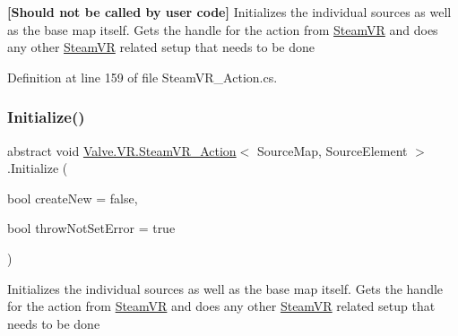{\bfseries{\mbox{[}Should not be called by user code\mbox{]}}} Initializes the individual sources as well as the base map itself. Gets the handle for the action from \mbox{\hyperlink{class_valve_1_1_v_r_1_1_steam_v_r}{Steam\+VR}} and does any other \mbox{\hyperlink{class_valve_1_1_v_r_1_1_steam_v_r}{Steam\+VR}} related setup that needs to be done 



Definition at line 159 of file Steam\+V\+R\+\_\+\+Action.\+cs.

\mbox{\label{class_valve_1_1_v_r_1_1_steam_v_r___action_a29bea2023c1139d9bd612b82d02f8d61}} 
\subsubsection{\texorpdfstring{Initialize()}{Initialize()}\hspace{0.1cm}{\footnotesize\ttfamily [2/2]}}
{\footnotesize\ttfamily abstract void \mbox{\hyperlink{class_valve_1_1_v_r_1_1_steam_v_r___action}{Valve.\+V\+R.\+Steam\+V\+R\+\_\+\+Action}}$<$ Source\+Map, Source\+Element $>$.Initialize (\begin{DoxyParamCaption}\item[{bool}]{create\+New = {\ttfamily false},  }\item[{bool}]{throw\+Not\+Set\+Error = {\ttfamily true} }\end{DoxyParamCaption})\hspace{0.3cm}{\ttfamily [pure virtual]}}



Initializes the individual sources as well as the base map itself. Gets the handle for the action from \mbox{\hyperlink{class_valve_1_1_v_r_1_1_steam_v_r}{Steam\+VR}} and does any other \mbox{\hyperlink{class_valve_1_1_v_r_1_1_steam_v_r}{Steam\+VR}} related setup that needs to be done 

\mbox{\label{class_valve_1_1_v_r_1_1_steam_v_r___action_af28d577bb913087c833873e4a66e9b2f}} 
